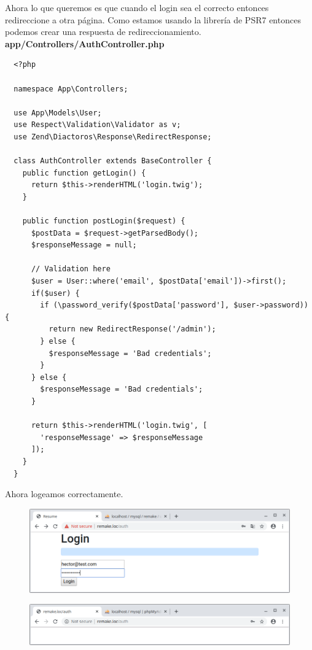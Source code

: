 \documentclass{article}
\begin{document}
Ahora lo que queremos es que cuando el login sea el correcto entonces
redireccione a otra página. Como estamos usando la librería de PSR7 entonces
podemos crear una respuesta de redireccionamiento.\\

\textbf{app/Controllers/AuthController.php}
\begin{verbatim}
  <?php

  namespace App\Controllers;

  use App\Models\User;
  use Respect\Validation\Validator as v;
  use Zend\Diactoros\Response\RedirectResponse;

  class AuthController extends BaseController {
    public function getLogin() {
      return $this->renderHTML('login.twig');
    }

    public function postLogin($request) {
      $postData = $request->getParsedBody();
      $responseMessage = null;

      // Validation here
      $user = User::where('email', $postData['email'])->first();
      if($user) {
        if (\password_verify($postData['password'], $user->password)) {
          return new RedirectResponse('/admin');
        } else {
          $responseMessage = 'Bad credentials';
        }
      } else {
        $responseMessage = 'Bad credentials';
      }

      return $this->renderHTML('login.twig', [
        'responseMessage' => $responseMessage
      ]);
    }
  }
\end{verbatim}

Ahora logeamos correctamente. 
\begin{figure}[h!]
  \centering
  \includegraphics[scale=0.5]{./Pictures/210_login_correct.png}
\end{figure}

\begin{figure}[h!]
  \centering
  \includegraphics[scale=0.5]{./Pictures/211_admin.png}
\end{figure}
\end{document}

